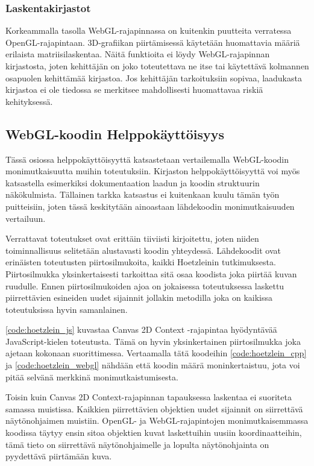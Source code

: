 \subsubsection{Laskentakirjastot}
Korkeammalla tasolla WebGL-rajapinnassa on kuitenkin puutteita verratessa OpenGL-rajapintaan. 3D-grafiikan piirtämisessä käytetään huomattavia määriä erilaista matriisilaskentaa. Näitä funktioita ei löydy WebGL-rajapinnan kirjastosta, joten kehittäjän on joko toteutettava ne itse tai käytettävä kolmannen osapuolen kehittämää kirjastoa. Jos kehittäjän tarkoituksiin sopivaa, laadukasta kirjastoa ei ole tiedossa se merkitsee mahdollisesti huomattavaa riskiä kehityksessä.


\subsection{WebGL-koodin Helppokäyttöisyys}
Tässä osiossa helppokäyttöisyyttä katsastetaan vertailemalla WebGL-koodin monimutkaisuutta muihin toteutuksiin. Kirjaston helppokäyttöisyyttä voi myös katsastella esimerkiksi dokumentaation laadun ja koodin struktuurin näkökulmista. Tällainen tarkka katsastus ei kuitenkaan kuulu tämän työn puitteisiin, joten tässä keskitytään ainoastaan lähdekoodin monimutkaisuuden vertailuun.

Verrattavat toteutukset ovat erittäin tiiviisti kirjoitettu, joten niiden toiminnallisuus selitetään alustavasti koodin yhteydessä. Lähdekoodit ovat erinäisten toteutusten piirtosilmukoita, kaikki Hoetzleinin\cite{hoetzlein} tutkimuksesta. Piirtosilmukka yksinkertaisesti tarkoittaa sitä osaa koodista joka piirtää kuvan ruudulle. Ennen piirtosilmukoiden ajoa on jokaisessa toteutuksessa laskettu piirrettävien esineiden uudet sijainnit jollakin metodilla joka on kaikissa toteutuksissa hyvin samanlainen\cite{hoetzlein}. 

\autoref{code:hoetzlein_js} kuvastaa Canvas 2D Context -rajapintaa hyödyntävää JavaScript-kielen toteutusta. Tämä on hyvin yksinkertainen piirtosilmukka joka ajetaan kokonaan suorittimessa. Vertaamalla tätä koodeihin \ref{code:hoetzlein_cpp} ja \ref{code:hoetzlein_webgl} nähdään että koodin määrä moninkertaistuu, jota voi pitää selvänä merkkinä monimutkaistumisesta. 

Toisin kuin Canvas 2D Context-rajapinnan tapauksessa laskentaa ei suoriteta samassa muistissa. Kaikkien piirrettävien objektien uudet sijainnit on siirrettävä näytönohjaimen muistiin. OpenGL- ja WebGL-rajapintojen monimutkaisemmassa koodissa täytyy ensin sitoa objektien kuvat laskettuihin uusiin koordinaatteihin, tämä tieto on siirrettävä näytönohjaimelle ja lopulta näytönohjainta on pyydettävä piirtämään kuva. 

